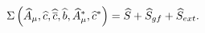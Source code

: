 \begin{equation}
\Sigma \left( \widehat{A}_{\mu },\widehat{c},\widehat{\overline{c}},\widehat{%
b},\widehat{A}_{\mu }^{\ast },\widehat{c}^{\ast }\right) =\widehat{S}+%
\widehat{S}_{gf}+\widehat{S}_{ext}. 
\end{equation}

